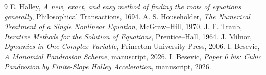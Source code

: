 \documentclass[11pt]{article}
\theoremstyle{definition}
\begin{document}
\begin{thebibliography}{9}
 E. Halley, \emph{A new, exact, and easy method of finding the roots of equations generally}, Philosophical Transactions, 1694.
 A. S. Householder, \emph{The Numerical Treatment of a Single Nonlinear Equation}, McGraw--Hill, 1970.
 J. F. Traub, \emph{Iterative Methods for the Solution of Equations}, Prentice--Hall, 1964.
 J. Milnor, \emph{Dynamics in One Complex Variable}, Princeton University Press, 2006.
 I. Besevic, \emph{A Monomial Pandrosion Scheme}, manuscript, 2026.
 I. Besevic, \emph{Paper 0 bis: Cubic Pandrosion by Finite-Slope Halley Acceleration}, manuscript, 2026.
\end{thebibliography}
\end{document}
